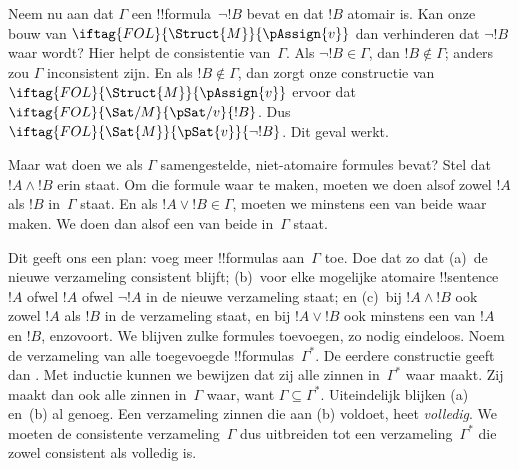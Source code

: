 \documentclass[openany]{memoir}
\begin{document}
Neem nu aan dat $\Gamma$ een !!{formula}~$\lnot !B$ bevat en dat $!B$
atomair is. Kan onze bouw van
$\iftag{FOL}{\Struct{M}}{\pAssign{v}}$ dan verhinderen dat $\lnot !B$
waar wordt? Hier helpt de consistentie van~$\Gamma$. Als
$\lnot !B \in \Gamma$, dan $!B \notin \Gamma$; anders zou $\Gamma$
inconsistent zijn. En als $!B \notin \Gamma$, dan zorgt onze
constructie van~$\iftag{FOL}{\Struct{M}}{\pAssign{v}}$ ervoor dat
$\iftag{FOL}{\Sat/{M}}{\pSat/{v}}{!B}$. Dus
$\iftag{FOL}{\Sat{M}}{\pSat{v}}{\lnot !B}$. Dit geval werkt.

Maar wat doen we als $\Gamma$ samengestelde, niet-atomaire formules
bevat? Stel dat $!A \land !B$ erin staat. Om die formule waar te maken,
moeten we doen alsof zowel $!A$ als $!B$ in~$\Gamma$ staat. En als
$!A \lor !B \in \Gamma$, moeten we minstens een van beide waar maken.
We doen dan alsof een van beide in~$\Gamma$ staat.

Dit geeft ons een plan: voeg meer !!{formula}s aan~$\Gamma$ toe. Doe
dat zo dat (a)~de nieuwe verzameling consistent blijft; (b)~voor elke
mogelijke atomaire !!{sentence}~$!A$ ofwel $!A$ ofwel $\lnot !A$ in de
nieuwe verzameling staat; en (c)~bij $!A \land !B$ ook zowel $!A$ als
$!B$ in de verzameling staat, en bij $!A \lor !B$ ook minstens een van
$!A$ en $!B$, enzovoort. We blijven zulke formules toevoegen, zo nodig
eindeloos. Noem de verzameling van alle toegevoegde
!!{formula}s~$\Gamma^*$. De eerdere constructie geeft dan
.
Met inductie kunnen we bewijzen dat zij alle zinnen in~$\Gamma^*$ waar
maakt. Zij maakt dan ook alle zinnen in~$\Gamma$ waar, want
$\Gamma \subseteq \Gamma^*$. Uiteindelijk blijken (a) en~(b) al
genoeg. Een verzameling zinnen die aan (b) voldoet, heet
\emph{volledig}. We moeten de consistente verzameling~$\Gamma$ dus
uitbreiden tot een verzameling~$\Gamma^*$ die zowel consistent als
volledig is.
\end{document}
